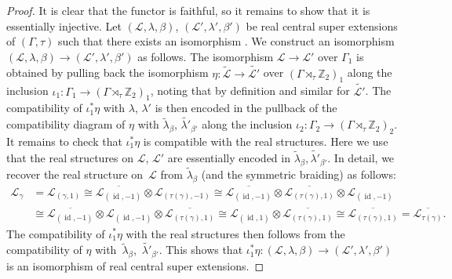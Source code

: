 \documentclass[10pt,a4paper]{amsart}
\numberwithin{equation}{section}
\def\mathscr#1{\EuScript{#1}}
\def\Z {\mathbb{Z}}
\newcommand{\id}{\operatorname{id}}
\begin{document}
\begin{proof}
It is clear that the functor is faithful, so it remains to show that it is essentially injective.
 Let $(\mathcal{L},\lambda,\beta)$, $(\mathcal{L}',\lambda',\beta')$ be real central super extensions of $(\Gamma,\tau)$ such that there exists an isomorphism
 \smash{$\eta \colon \bigl(\mathscr{I},\tilde{\mathcal{L}},\tilde{\lambda}_{\beta}\bigr) \to \bigl(\mathscr{I},\tilde{\mathcal{L}'},\tilde{\lambda'}_{\beta'}\bigr)$}. We construct an isomorphism
 $(\mathcal{L},\lambda,\beta) \to (\mathcal{L}',\lambda',\beta')$ as follows.
 The isomorphism $\mathcal{L} \to \mathcal{L}'$ over $\Gamma_1$ is obtained by pulling back the isomorphism $\eta \colon \tilde{\mathcal{L}} \to \tilde{\mathcal{L}'}$ over $(\Gamma \rtimes_{\tau} \Z_2)_1$
 along the inclusion $\iota_1 \colon \Gamma_1 \to (\Gamma \rtimes_{\tau} \Z_2)_1$, noting that  by definition
 and similar for $\tilde{\mathcal{L}'}$. The compatibility of $\iota_1^*\eta$ with $\lambda$, $\lambda'$ is then encoded in the pullback of the compatibility diagram
 of $\eta$ with $\tilde{\lambda}_{\beta}$, $\tilde{\lambda'}_{\beta'}$ along the inclusion $\iota_2 \colon \Gamma_2 \to (\Gamma \rtimes_{\tau} \Z_2)_2$. It remains to
 check that $\iota_1^*\eta$ is compatible with the real structures. Here we use that the real structures on $\mathcal{L}$, $\mathcal{L}'$ are essentially encoded in
 $\tilde{\lambda}_{\beta}, \tilde{\lambda'}_{\beta'}$. In detail, we recover the real structure on~$\mathcal{L}$ from $\tilde{\lambda}_{\beta}$ (and the symmetric braiding)
 as follows:
 \begin{align*}
 \mathcal{L}_\gamma
 &= \mathcal{L}_{(\gamma,1)} \cong \overline{\mathcal{L}_{(\id,-1)}} \otimes \mathcal{L}_{(\tau(\gamma),-1)}\cong \overline{\mathcal{L}_{(\id,-1)}} \otimes \overline{\mathcal{L}_{(\tau(\gamma),1)}} \otimes \mathcal{L}_{(\id,-1)} \\
 &\cong \overline{\mathcal{L}_{(\id,-1)}} \otimes \mathcal{L}_{(\id,-1)} \otimes \overline{\mathcal{L}_{(\tau(\gamma),1)}} \cong \mathcal{L}_{(\id,1)} \otimes \overline{\mathcal{L}_{(\tau(\gamma),1)}} \cong \overline{\mathcal{L}_{(\tau(\gamma),1)}}= \overline{\mathcal{L}_{\tau(\gamma)}}.
 \end{align*}
 The compatibility of $\iota_1^*\eta$ with the real structures then follows from the compatibility of $\eta$ with~$\tilde{\lambda}_{\beta}$,~$\tilde{\lambda'}_{\beta'}$.
 This shows that $\iota_1^*\eta \colon (\mathcal{L},\lambda,\beta) \to (\mathcal{L}',\lambda',\beta')$ is an isomorphism of real central super extensions.
\end{proof}
\end{document}
